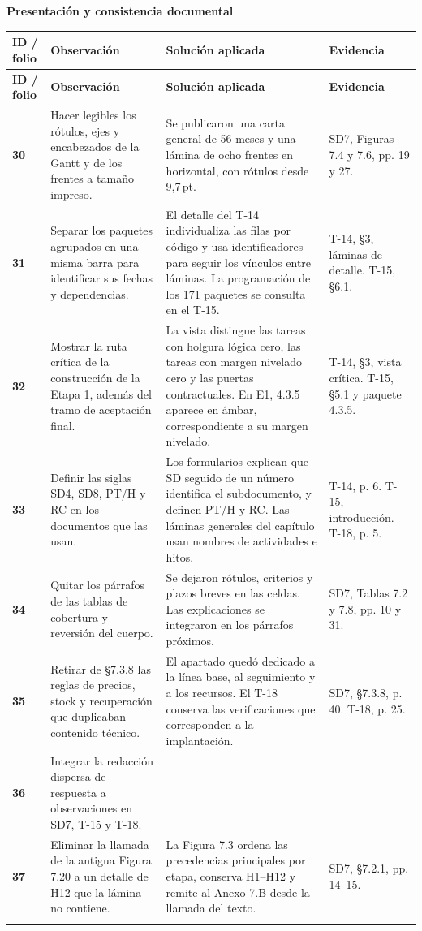 \documentclass[11pt,letterpaper]{article}
\makeatletter
\newcommand{\tema}[1]{\par{\Large\bfseries #1}\par}
\newcommand{\cabecera}{\rowcolor{fondo}
  \textbf{ID / folio} & \textbf{Observación} & \textbf{Solución aplicada} & \textbf{Evidencia}\\}
\newenvironment{matriz}{%
  \fontsize{10}{13}\selectfont
  \begin{longtable}{@{}>{\RaggedRight\arraybackslash}p{.099\linewidth}
                      >{\RaggedRight\arraybackslash}p{.360\linewidth}
                      >{\RaggedRight\arraybackslash}p{.329\linewidth}
                      >{\RaggedRight\arraybackslash}p{.152\linewidth}@{}}
    \cabecera\endfirsthead
    \cabecera\endhead
}{\end{longtable}\normalsize}
\newcommand{\observacion}[5]{%
  \rule{0pt}{2.3ex}\textbf{#1}\newline {\footnotesize #2} &
  #3 & #4 & #5 \\[2pt]\arrayrulecolor{regla}\midrule}
\makeatother
\begin{document}
\newpage
\tema{Presentación y consistencia documental}
\begin{matriz}
\observacion{30}{29--30, 33}
{Hacer legibles los rótulos, ejes y encabezados de la Gantt y de los frentes a tamaño impreso.}
{Se publicaron una carta general de 56 meses y una lámina de ocho frentes en horizontal, con rótulos desde 9,7\,pt.}
{SD7, Figuras 7.4 y 7.6, pp. 19 y 27.}
\observacion{31}{30}
{Separar los paquetes agrupados en una misma barra para identificar sus fechas y dependencias.}
{El detalle del T-14 individualiza las filas por código y usa identificadores para seguir los vínculos entre láminas. La programación de los 171 paquetes se consulta en el T-15.}
{T-14, §3, láminas de detalle. T-15, §6.1.}
\observacion{32}{33}
{Mostrar la ruta crítica de la construcción de la Etapa 1, además del tramo de aceptación final.}
{La vista distingue las tareas con holgura lógica cero, las tareas con margen nivelado cero y las puertas contractuales. En E1, 4.3.5 aparece en ámbar, correspondiente a su margen nivelado.}
{T-14, §3, vista crítica. T-15, §5.1 y paquete 4.3.5.}
\observacion{33}{29, 32}
{Definir las siglas SD4, SD8, PT/H y RC en los documentos que las usan.}
{Los formularios explican que SD seguido de un número identifica el subdocumento, y definen PT/H y RC. Las láminas generales del capítulo usan nombres de actividades e hitos.}
{T-14, p. 6. T-15, introducción. T-18, p. 5.}
\observacion{34}{32--33}
{Quitar los párrafos de las tablas de cobertura y reversión del cuerpo.}
{Se dejaron rótulos, criterios y plazos breves en las celdas. Las explicaciones se integraron en los párrafos próximos.}
{SD7, Tablas 7.2 y 7.8, pp. 10 y 31.}
\observacion{35}{32--33}
{Retirar de §7.3.8 las reglas de precios, stock y recuperación que duplicaban contenido técnico.}
{El apartado quedó dedicado a la línea base, al seguimiento y a los recursos. El T-18 conserva las verificaciones que corresponden a la implantación.}
{SD7, §7.3.8, p. 40. T-18, p. 25.}
\observacion{36}{32}
{Integrar la redacción dispersa de respuesta a observaciones en SD7, T-15 y T-18.}{}{}
\observacion{37}{32}
{Eliminar la llamada de la antigua Figura 7.20 a un detalle de H12 que la lámina no contiene.}
{La Figura 7.3 ordena las precedencias principales por etapa, conserva H1--H12 y remite al Anexo 7.B desde la llamada del texto.}
{SD7, §7.2.1, pp. 14--15.}
\end{matriz}
\end{document}
